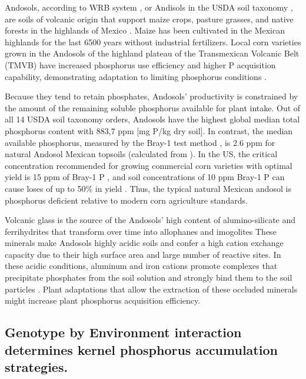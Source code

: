 Andosols, according to WRB system \citep{wrb2022}, or Andisols in the USDA soil taxonomy \citep{scheffe2015, krasilnikov2013}, are soils of volcanic origin that support maize crops, pasture grasses, and native forests in the highlands of Mexico \citep{bayuelo-jimenez2020,galvan-tejada2014}. Maize has been cultivated in the Mexican highlands for the last 6500 years \citep{piperno2001} without industrial fertilizers. Local corn varieties grown in the Andosols of the highland plateau of the Transmexican Volcanic Belt (TMVB) have increased phosphorus use efficiency and higher P acquisition capability, demonstrating adaptation to limiting phosphorus conditions \citep{bayuelo-jimenez2011,bayuelo-jimenez2014}.

Because they tend to retain phosphates, Andosols' productivity is constrained by the amount of the remaining soluble phosphorus available for plant intake.
Out of all 14 USDA soil taxonomy orders, Andosols have the highest global median total phosphorus content with 883,7 ppm [mg P/kg dry soil]\citep{hexianjin2022}.
In contrast, the median available phosphorus, measured by the Bray-1 test method \citep{bray1945}, is 2.6 ppm for natural Andosol Mexican topsoils (calculated from \cite{paz-pellat2018}). 
In the US, the critical concentration recommended for growing commercial corn varieties with optimal yield is 15 ppm of Bray-1 P \citep{lyons2023}, and soil concentrations of 10 ppm Bray-1 P can cause loses of up to 50\% in yield \citep{dodd2005}.
Thus, the typical natural Mexican andosol is phosphorus deficient relative to modern corn agriculture standards. 

Volcanic glass is the source of the Andosols’ high content of alumino-silicate and ferrihydrites that transform over time into allophanes and imogolites \citep{wrb2022}
These minerals make Andosols highly acidic soils and confer a high cation exchange capacity due to their high surface area and large number of reactive sites\citep{krasilnikov2013}.
In these acidic conditions, aluminum and iron cations promote complexes that precipitate phosphates from the soil solution and strongly bind them to the soil particles \citep{krasilnikov2013}. Plant adaptations that allow the extraction of these occluded minerals might increase plant phosphorus acquisition efficiency. 


\subsection{Genotype by Environment interaction determines kernel phosphorus  accumulation strategies.}

